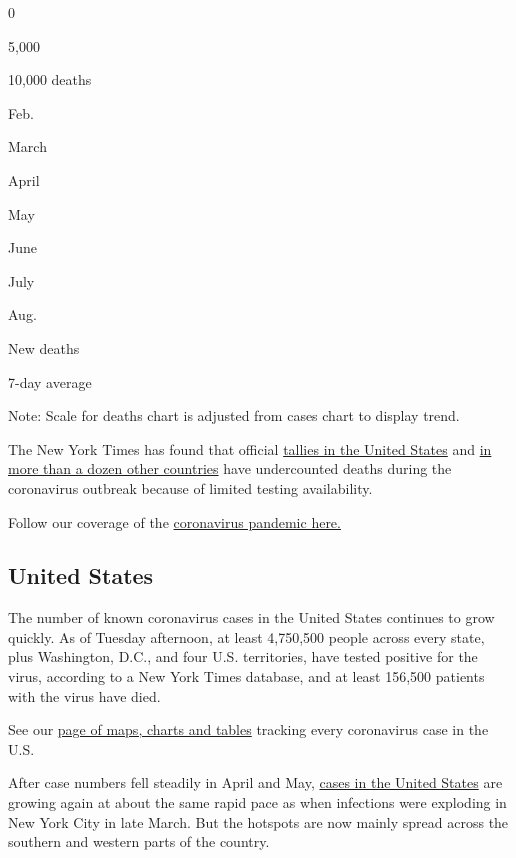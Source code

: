 0

5,000

10,000 deaths

Feb.

March

April

May

June

July

Aug.

New deaths

7-day average

Note: Scale for deaths chart is adjusted from cases chart to display
trend.

The New York Times has found that official
\href{https://www.nytimes3xbfgragh.onion/interactive/2020/04/28/us/coronavirus-death-toll-total.html}{tallies
in the United States} and
\href{https://www.nytimes3xbfgragh.onion/interactive/2020/04/21/world/coronavirus-missing-deaths.html}{in
more than a dozen other countries} have undercounted deaths during the
coronavirus outbreak because of limited testing availability.

Follow our coverage of the
\href{https://www.nytimes3xbfgragh.onion/2020/08/04/world/coronavirus-covid-19.html}{coronavirus
pandemic here.}

\hypertarget{united-states}{%
\subsection{United States}\label{united-states}}

The number of known coronavirus cases in the United States continues to
grow quickly. As of Tuesday afternoon, at least 4,750,500 people across
every state, plus Washington, D.C., and four U.S. territories, have
tested positive for the virus, according to a New York Times database,
and at least 156,500 patients with the virus have died.

See our
\href{https://www.nytimes3xbfgragh.onion/interactive/2020/us/coronavirus-us-cases.html}{page
of maps, charts and tables} tracking every coronavirus case in the U.S.

After case numbers fell steadily in April and May,
\href{https://www.nytimes3xbfgragh.onion/interactive/2020/us/coronavirus-us-cases.html}{cases
in the United States} are growing again at about the same rapid pace as
when infections were exploding in New York City in late March. But the
hotspots are now mainly spread across the southern and western parts of
the country.

